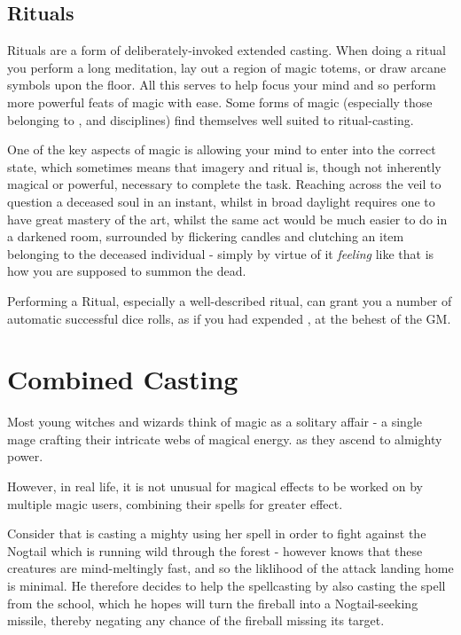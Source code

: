 \subsection{Rituals}

Rituals are a form of deliberately-invoked extended casting. When doing a ritual you perform a long meditation, lay out a region of magic totems, or draw arcane symbols upon the floor. All this serves to help focus your mind and so perform more powerful feats of magic with ease. Some forms of magic (especially those belonging to ,  and  disciplines) find themselves well suited to ritual-casting. 

One of the key aspects of magic is allowing your mind to enter into the correct state, which sometimes means that imagery and ritual is, though not inherently magical or powerful, necessary to complete the task. Reaching across the veil to question a deceased soul in an instant, whilst in broad daylight requires one to have great mastery of the art, whilst the same act would be much easier to do in a darkened room, surrounded by flickering candles and clutching an item belonging to the deceased individual - simply by virtue of it {\it feeling} like that is how you are supposed to summon the dead. 

Performing a Ritual, especially a well-described ritual, can grant you a number of automatic successful dice rolls, as if you had expended , at the behest of the GM.  


\section{Combined Casting}

Most young witches and wizards think of magic as a solitary affair - a single mage crafting their intricate webs of magical energy. as they ascend to almighty power.  

However, in real life, it is not unusual for magical effects to be worked on by multiple magic users, combining their spells for greater effect. 

Consider that  is casting a mighty  using her  spell in order to fight against the Nogtail which is running wild through the forest - however  knows that these creatures are mind-meltingly fast, and so the liklihood of the attack landing home is minimal. He therefore decides to help the spellcasting by also casting the  spell from the  school, which he hopes will turn the fireball into a Nogtail-seeking missile, thereby negating any chance of the fireball missing its target. 

